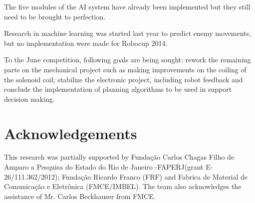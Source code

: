 \documentclass{llncs}
\begin{document}
The five modules of the AI system have already been implemented but they still
need to be brought to perfection.

Research in machine learning was started last year to predict enemy movements,
but no implementation were made for Robocup 2014.

To the June competition, following goals are being sought: 
rework the remaining parts on the mechanical project such as making improvements on the coiling of the solenoid coil;
stabilize the electronic project, including robot feedback and
conclude the implementation of planning algorithms to be used in support decision making.

\section*{Acknowledgements}
This research was partially supported by Fundação Carlos Chagas Filho de Amparo a Pesquisa do Estado do Rio de Janeiro -FAPERJ(grant E-26/111.362/2012); Fundação Ricardo Franco (FRF) and Fabrica de Material de Comunicação e Eletrônica (FMCE/IMBEL). The team also acknowledges the assistance of Mr. Carlos Beckhauser from FMCE.
\end{document}

